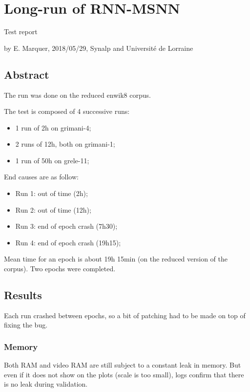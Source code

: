 \section*{Long-run of RNN-MSNN}

Test report

by E. Marquer, 2018/05/29, Synalp and Université de Lorraine

\subsection{Abstract}

The run was done on the reduced enwik8 corpus.

The test is composed of 4 successive runs:
\begin{itemize}
	\item 1 run of 2h on grimani-4;
	\item 2 runs of 12h, both on grimani-1;
	\item 1 run of 50h on grele-11;
\end{itemize}

End causes are as follow: 
\begin{itemize}
	\item Run 1: out of time (2h);
	\item Run 2: out of time (12h);
	\item Run 3: end of epoch crash (7h30);
	\item Run 4: end of epoch crash (19h15);
\end{itemize}

Mean time for an epoch is about 19h 15min (on the reduced version of the
corpus). Two epochs were completed.

\subsection{Results}

Each run crashed between epochs, so a bit of patching had to be made on
top of fixing the bug.

\subsubsection{Memory}

Both RAM and video RAM are still subject to a constant leak in memory.
But even if it does not show on the plots (scale is too small), logs
confirm that there is no leak during validation.

